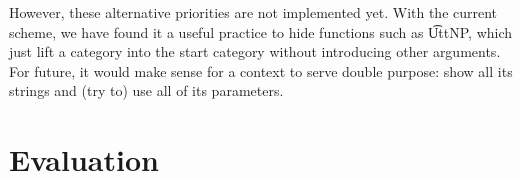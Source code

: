 However, these alternative priorities are not implemented yet. With
the current scheme, we have found it a useful practice to hide
functions such as \t{UttNP}, which just lift a category into the start
category without introducing other arguments. For future, it would
make sense for a context to serve double purpose: show all its strings
and (try to) use all of its parameters.




\section{Evaluation}
\label{sec:evalGF}

\begin{table}[h]
\centering
{}
\caption{Test cases for all functions in three grammars}
\label{results}
\end{table}


